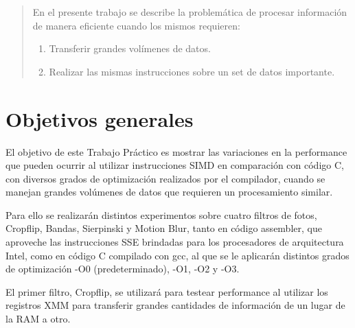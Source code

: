 \documentclass[a4paper]{article}
\begin{document}
\thispagestyle{empty}

\maketitle
\newpage

\thispagestyle{empty}
\vfill
\begin{abstract}
En el presente trabajo se describe la problemática de procesar información de manera eficiente cuando los mismos requieren:
\begin{enumerate}
\item Transferir grandes volímenes de datos.
\item Realizar las mismas instrucciones sobre un set de datos importante.
\end{enumerate}
\end{abstract}
\thispagestyle{empty}
\vspace{3cm}
\tableofcontents
\newpage

\newpage

\section{Objetivos generales}

El objetivo de este Trabajo Práctico es mostrar las variaciones en la performance que pueden ocurrir al utilizar instrucciones SIMD en comparación con código C, con diversos grados de optimización realizados por el compilador, cuando se manejan grandes volúmenes de datos que requieren un procesamiento similar.

Para ello se realizarán distintos experimentos sobre cuatro filtros de fotos, Cropflip, Bandas, Sierpinski y Motion Blur, tanto en código assembler, que aproveche las instrucciones SSE brindadas para los procesadores de arquitectura Intel, como en código C compilado con gcc, al que se le aplicarán distintos grados de optimización -O0 (predeterminado), -O1, -O2 y -O3.

El primer filtro, Cropflip, se utilizará para testear performance al utilizar los registros XMM para transferir grandes cantidades de información de un lugar de la RAM a otro.
\end{document}
